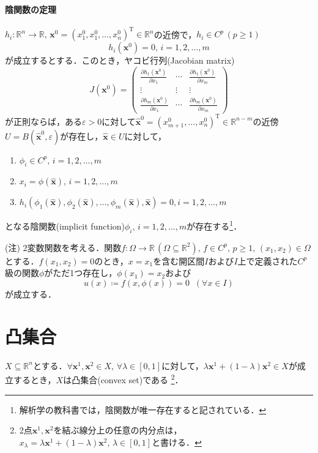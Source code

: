 \documentclass{jsreport}
\begin{document}
\paragraph{陰関数の定理}
$h_i: \mathbb{R}^n \rightarrow \mathbb{R}, \, \bm{x}^0 = (x_1^0, x_1^0, \ldots, x_n^0)^{\mathrm{T}} \in \mathbb{R}^n$の近傍で，$h_i \in C^p \, (p \geq 1)$
\begin{equation}
  h_i(\bm{x}^0) = 0, \, i = 1, 2, \ldots, m \nonumber
\end{equation}
が成立するとする．このとき，ヤコビ行列(Jacobian matrix)
\begin{equation}
  J(\bm{x}^0) = \left(
  \begin{array}{ccc}
    \displaystyle \frac{\partial h_1(\bm{x}^0)}{\partial x_1} & \cdots & \displaystyle \frac{\partial h_1(\bm{x}^0)}{\partial x_m} \\
    \vdots & \vdots & \vdots \\
    \displaystyle \frac{\partial h_m(\bm{x}^0)}{\partial x_1} & \cdots & \displaystyle \frac{\partial h_m(\bm{x}^0)}{\partial x_m}
  \end{array}
  \right) \nonumber
\end{equation}
が正則ならば，ある$\varepsilon > 0$に対して$\hat{\bm{x}}^0 = (x_{m + 1}^0, \ldots, x_n^0)^{\mathrm{T}} \in \mathbb{R}^{n - m}$の近傍$U = B(\hat{\bm{x}}^0, \varepsilon)$が存在し，$\hat{\bm{x}} \in U$に対して，
\begin{enumerate}
  \item $\phi_i \in C^p, \, i = 1, 2, \ldots, m$
  \item $x_i = \phi(\hat{\bm{x}}), \, i = 1, 2, \ldots, m$
  \item $h_i(\phi_1(\hat{\bm{x}}), \phi_2(\hat{\bm{x}}), \ldots, \phi_m(\hat{\bm{x}}), \hat{\bm{x}}) = 0, i = 1, 2, \ldots, m$
\end{enumerate}
となる陰関数(implicit function)$\phi_i, \, i = 1, 2, \ldots, m$が存在する\footnote{解析学の教科書では，陰関数が唯一存在すると記されている．}．

(注) 2変数関数を考える．関数$f: \Omega \rightarrow \mathbb{R} \, (\Omega \subseteq \mathbb{R}^2), \, f \in C^p, \, p \geq 1, \, (x_1, x_2) \in \Omega$とする．$f(x_1, x_2) = 0$のとき，$x = x_1$を含む開区間$I$および$I$上で定義された$C^p$級の関数$\phi$がただ1つ存在し，$\phi(x_1) = x_2$および
\begin{equation}
  u(x) \coloneqq f(x, \phi(x)) = 0 \; \; (\forall x \in I) \nonumber
\end{equation}
が成立する．

\section{凸集合}
$X \subseteq \mathbb{R}^n$とする．$\forall \bm{x}^1, \bm{x}^2 \in X, \, \forall \lambda \in [0, 1]$に対して，$\lambda \bm{x}^1 + (1 - \lambda)\bm{x}^2 \in X$が成立するとき，$X$は凸集合(convex set)である
\footnote{2点$\bm{x}^1, \bm{x}^2$を結ぶ線分上の任意の内分点は，$x_{\lambda} = \lambda \bm{x}^1 + (1 - \lambda)\bm{x}^2, \, \lambda \in [0, 1]$と書ける．}．
\end{document}
